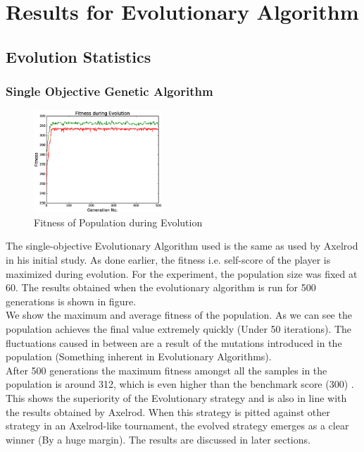 \documentclass[a4paper]{article}
\begin{document}
	\section{Results for Evolutionary Algorithm}

	\subsection{Evolution Statistics}

	\subsubsection{Single Objective Genetic Algorithm}	

	\begin{figure}
	\centering
	\includegraphics[width=0.43\textwidth]{singFitPlot.eps}
	\caption{\footnotesize{Fitness of Population during Evolution}}
	\end{figure}
	The single-objective Evolutionary Algorithm used is the same as used by Axelrod in his initial study. As done earlier, the fitness i.e. self-score of the player is maximized during evolution. For the experiment, the population size was fixed at 60. The results obtained when the evolutionary algorithm is run for 500 generations is shown in figure.\\
	We show the maximum and average fitness of the population. As we can see the population achieves the final value extremely quickly (Under 50 iterations). The fluctuations caused in between are a result of the mutations introduced in the population (Something inherent in Evolutionary Algorithms).\\
	After 500 generations the maximum fitness amongst all the samples in the population is around 312, which is even higher than the benchmark score (300) \cite{dawkins}. This shows the superiority of the Evolutionary strategy and is also in line with the results obtained by Axelrod. When this strategy is pitted against other strategy in an Axelrod-like tournament, the evolved strategy emerges as a clear winner (By a huge margin). The results are discussed in later sections.	
\end{document}
